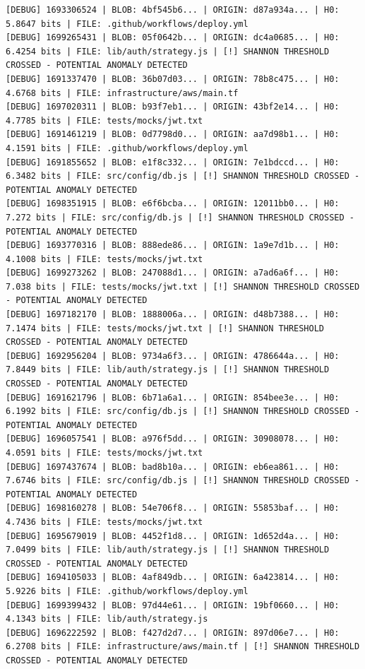 \documentclass[12pt, a4paper, oneside]{report}
\begin{document}
\begin{lstlisting}[basicstyle=\tiny\ttfamily]
[DEBUG] 1693306524 | BLOB: 4bf545b6... | ORIGIN: d87a934a... | H0: 5.8647 bits | FILE: .github/workflows/deploy.yml
[DEBUG] 1699265431 | BLOB: 05f0642b... | ORIGIN: dc4a0685... | H0: 6.4254 bits | FILE: lib/auth/strategy.js | [!] SHANNON THRESHOLD CROSSED - POTENTIAL ANOMALY DETECTED
[DEBUG] 1691337470 | BLOB: 36b07d03... | ORIGIN: 78b8c475... | H0: 4.6768 bits | FILE: infrastructure/aws/main.tf
[DEBUG] 1697020311 | BLOB: b93f7eb1... | ORIGIN: 43bf2e14... | H0: 4.7785 bits | FILE: tests/mocks/jwt.txt
[DEBUG] 1691461219 | BLOB: 0d7798d0... | ORIGIN: aa7d98b1... | H0: 4.1591 bits | FILE: .github/workflows/deploy.yml
[DEBUG] 1691855652 | BLOB: e1f8c332... | ORIGIN: 7e1bdccd... | H0: 6.3482 bits | FILE: src/config/db.js | [!] SHANNON THRESHOLD CROSSED - POTENTIAL ANOMALY DETECTED
[DEBUG] 1698351915 | BLOB: e6f6bcba... | ORIGIN: 12011bb0... | H0: 7.272 bits | FILE: src/config/db.js | [!] SHANNON THRESHOLD CROSSED - POTENTIAL ANOMALY DETECTED
[DEBUG] 1693770316 | BLOB: 888ede86... | ORIGIN: 1a9e7d1b... | H0: 4.1008 bits | FILE: tests/mocks/jwt.txt
[DEBUG] 1699273262 | BLOB: 247088d1... | ORIGIN: a7ad6a6f... | H0: 7.038 bits | FILE: tests/mocks/jwt.txt | [!] SHANNON THRESHOLD CROSSED - POTENTIAL ANOMALY DETECTED
[DEBUG] 1697182170 | BLOB: 1888006a... | ORIGIN: d48b7388... | H0: 7.1474 bits | FILE: tests/mocks/jwt.txt | [!] SHANNON THRESHOLD CROSSED - POTENTIAL ANOMALY DETECTED
[DEBUG] 1692956204 | BLOB: 9734a6f3... | ORIGIN: 4786644a... | H0: 7.8449 bits | FILE: lib/auth/strategy.js | [!] SHANNON THRESHOLD CROSSED - POTENTIAL ANOMALY DETECTED
[DEBUG] 1691621796 | BLOB: 6b71a6a1... | ORIGIN: 854bee3e... | H0: 6.1992 bits | FILE: src/config/db.js | [!] SHANNON THRESHOLD CROSSED - POTENTIAL ANOMALY DETECTED
[DEBUG] 1696057541 | BLOB: a976f5dd... | ORIGIN: 30908078... | H0: 4.0591 bits | FILE: tests/mocks/jwt.txt
[DEBUG] 1697437674 | BLOB: bad8b10a... | ORIGIN: eb6ea861... | H0: 7.6746 bits | FILE: src/config/db.js | [!] SHANNON THRESHOLD CROSSED - POTENTIAL ANOMALY DETECTED
[DEBUG] 1698160278 | BLOB: 54e706f8... | ORIGIN: 55853baf... | H0: 4.7436 bits | FILE: tests/mocks/jwt.txt
[DEBUG] 1695679019 | BLOB: 4452f1d8... | ORIGIN: 1d652d4a... | H0: 7.0499 bits | FILE: lib/auth/strategy.js | [!] SHANNON THRESHOLD CROSSED - POTENTIAL ANOMALY DETECTED
[DEBUG] 1694105033 | BLOB: 4af849db... | ORIGIN: 6a423814... | H0: 5.9226 bits | FILE: .github/workflows/deploy.yml
[DEBUG] 1699399432 | BLOB: 97d44e61... | ORIGIN: 19bf0660... | H0: 4.1343 bits | FILE: lib/auth/strategy.js
[DEBUG] 1696222592 | BLOB: f427d2d7... | ORIGIN: 897d06e7... | H0: 6.2708 bits | FILE: infrastructure/aws/main.tf | [!] SHANNON THRESHOLD CROSSED - POTENTIAL ANOMALY DETECTED

\end{lstlisting}
\end{document}

